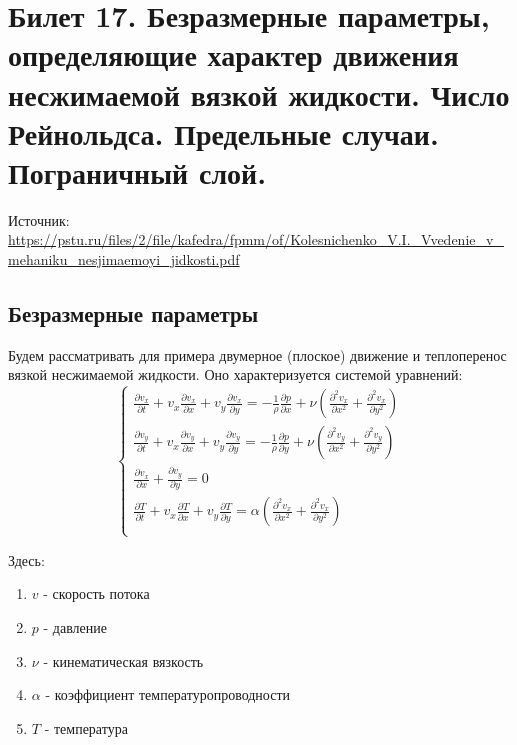 \newpage
\section{Билет 17. Безразмерные параметры, определяющие характер движения несжимаемой вязкой жидкости. Число Рейнольдса. Предельные случаи. Пограничный слой.}

Источник: \url{https://pstu.ru/files/2/file/kafedra/fpmm/of/Kolesnichenko_V.I._Vvedenie_v_mehaniku_nesjimaemoyi_jidkosti.pdf}

\subsection{Безразмерные параметры}
Будем рассматривать для примера двумерное (плоское) движение и теплоперенос вязкой несжимаемой жидкости. Оно характеризуется системой уравнений:
\begin{equation}
    \begin{cases}
        \frac{\partial v_x}{\partial t} + v_x\frac{\partial v_x}{\partial x} + v_y\frac{\partial v_x}{\partial y} = -\frac{1}{\rho} \frac{\partial p}{\partial x} + \nu (\frac{\partial^2 v_x}{\partial x^2} + \frac{\partial^2 v_x}{\partial y^2})\\

        \frac{\partial v_y}{\partial t} + v_x\frac{\partial v_y}{\partial x} + v_y\frac{\partial v_y}{\partial y} = -\frac{1}{\rho} \frac{\partial p}{\partial y} + \nu (\frac{\partial^2 v_y}{\partial x^2} + \frac{\partial^2 v_y}{\partial y^2})\\

        \frac{\partial v_x}{\partial x} + \frac{\partial v_y}{\partial y} = 0\\

        \frac{\partial T}{\partial t} + v_x\frac{\partial T}{\partial x} + v_y\frac{\partial T}{\partial y} = \alpha(\frac{\partial^2 v_x}{\partial x^2} + \frac{\partial^2 v_x}{\partial y^2})\\
    \end{cases}
\end{equation}

Здесь:
\begin{enumerate}
    \item[\textbullet] $v$ - скорость потока
    \item[\textbullet] $p$ - давление
    \item[\textbullet] $\nu$ - кинематическая вязкость 
    \item[\textbullet] $\alpha$ - коэффициент температуропроводности
    \item[\textbullet] $T$ - температура
\end{enumerate}

